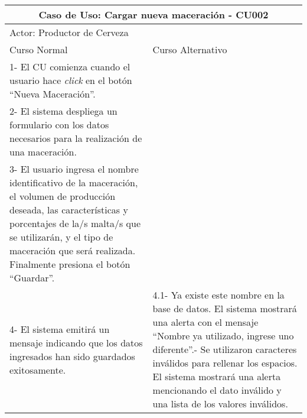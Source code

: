     \begin{table}[H]
    \begin{center}
    \begin{tabularx}{\textwidth}{ | X | X |}
        \hline
        \multicolumn{2}{|c|}{\textbf{Caso de Uso: Cargar nueva maceración - CU002}} \\
        \hline
        \multicolumn{2}{|l|}{Actor: Productor de Cerveza} \\
        \hline
        Curso Normal & Curso Alternativo \\
        \hline
        1- El CU comienza cuando el usuario hace \textit{click} en el botón “Nueva Maceración”. & \\
        \hline
        2- El sistema despliega un formulario con los datos necesarios para la realización de una maceración. &
        \\
        \hline
        3- El usuario ingresa el nombre identificativo de la maceración, el volumen de producción deseada, las características y porcentajes de la/s malta/s que se utilizarán, y el tipo de maceración que será realizada. Finalmente presiona el botón “Guardar”. &
        \\
        \hline
        4- El sistema emitirá un mensaje indicando que los datos ingresados han sido guardados exitosamente.  & 
        4.1- Ya existe este nombre en la base de datos. El sistema mostrará una alerta con el mensaje “Nombre ya utilizado, ingrese uno diferente”.\newline 4.2- Se utilizaron caracteres inválidos para rellenar los espacios. El sistema mostrará una alerta mencionando el dato inválido y una lista de los valores inválidos.
        \\
        \hline
    \end{tabularx}
    \label{CU002}
    \end{center}
    \end{table}
    
